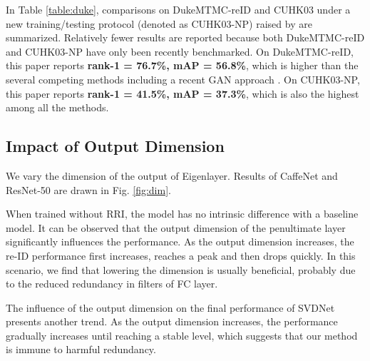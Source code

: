 \documentclass[10pt,twocolumn,letterpaper]{article}
\begin{document}
In Table \ref{table:duke}, comparisons on DukeMTMC-reID and CUHK03 under a new training/testing protocol (denoted as CUHK03-NP) raised by \cite{DBLP:conf/cvpr/ZhongZCL17} are summarized. Relatively fewer results are reported because both DukeMTMC-reID and CUHK03-NP have only been recently benchmarked. On DukeMTMC-reID, this paper reports \textbf{rank-1 = 76.7\%, mAP = 56.8\%}, which is higher than the several competing methods including a recent GAN approach \cite{zheng2017unlabeled}. On CUHK03-NP, this paper reports \textbf{rank-1 = 41.5\%, mAP = 37.3\%}, which is also the highest among all the methods. 

\subsection{Impact of Output Dimension} \label{sec:dimension}
We vary the dimension of the output of Eigenlayer. Results of CaffeNet and ResNet-50 are drawn in Fig. \ref{fig:dim}.
 
When trained without RRI, the model has no intrinsic difference with a baseline model. It can be observed that the output dimension of the penultimate layer significantly influences the performance. As the output dimension increases, the re-ID performance first increases, reaches a peak and then drops quickly. In this scenario, we find that lowering the dimension is usually beneficial, probably due to the reduced redundancy in filters of FC layer. 

The influence of the output dimension on the final performance of SVDNet presents another trend. As the output dimension increases, the performance gradually increases until reaching a stable level, which suggests that our method is immune to harmful redundancy.

 
\end{document}

